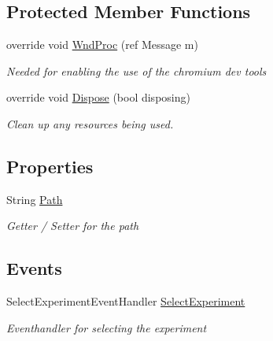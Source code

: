 \subsection*{Protected Member Functions}
\begin{DoxyCompactItemize}
\item 
override void \hyperlink{class_web_analyzer_1_1_u_i_1_1_select_experiment_form_a84a3493bde370f13c6e2dc039da3d120}{Wnd\+Proc} (ref Message m)
\begin{DoxyCompactList}\small\item\em Needed for enabling the use of the chromium dev tools \end{DoxyCompactList}\item 
override void \hyperlink{class_web_analyzer_1_1_u_i_1_1_select_experiment_form_abb5373fcb6854347261f268740f0415c}{Dispose} (bool disposing)
\begin{DoxyCompactList}\small\item\em Clean up any resources being used. \end{DoxyCompactList}\end{DoxyCompactItemize}
\subsection*{Properties}
\begin{DoxyCompactItemize}
\item 
String \hyperlink{class_web_analyzer_1_1_u_i_1_1_select_experiment_form_ad5b8d4def72474dd55f8d244955bae36}{Path}
\begin{DoxyCompactList}\small\item\em Getter / Setter for the path \end{DoxyCompactList}\end{DoxyCompactItemize}
\subsection*{Events}
\begin{DoxyCompactItemize}
\item 
Select\+Experiment\+Event\+Handler \hyperlink{class_web_analyzer_1_1_u_i_1_1_select_experiment_form_a1e364e5b7061777bab04e7b255eff656}{Select\+Experiment}
\begin{DoxyCompactList}\small\item\em Eventhandler for selecting the experiment \end{DoxyCompactList}\end{DoxyCompactItemize}
